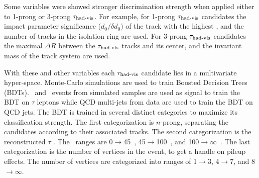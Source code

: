 \begin{enumerate}
%
%
\end{enumerate}

\par Some variables were showed stronger discrimination strength when applied either to 1-prong 
or 3-prong $\tau_{\text{had-vis}}$. For example, for 1-prong $\tau_{\text{had-vis}}$ candidates the impact parameter 
significance ($d_0/\delta d_0)$ of the track  with the highest \pT, and the number of tracks in the 
isolation ring are used. For 3-prong $\tau_{\text{had-vis}}$ candidates the maximal $\Delta R$ between the $\tau_{\text{had-vis}}$
tracks and its center, and the invariant mass of the track system are used. 

\par With these and other variables each $\tau_{\text{had-vis}}$ candidate lies in a multivariate hyper-space. Monte-Carlo 
simulations are used to train Boosted Decision Trees (BDTs).
\Ztautau\ and \Wtaunu\ events from simulated samples are used as signal to train the 
BDT on $\tau$ leptons while QCD multi-jets from data are used to train the BDT on QCD jets. 
The BDT is trained in several distinct categories to maximize its classification 
strength. The first categorization is $n$-prong, separating the candidates according to their 
associated tracks.
The second categorization is the reconstructed $\tau$ \pt. The \pt\ ranges are 
0$\to$45~\GeV, 45$\to$100~\GeV, and 100$\to\infty$~\GeV. The last categorization is the number of 
vertices in the event, to get a handle on pileup effects. The number of vertices are 
categorized into ranges of 1$\to$3, 4$\to$7, and 8$\to\infty$.   

